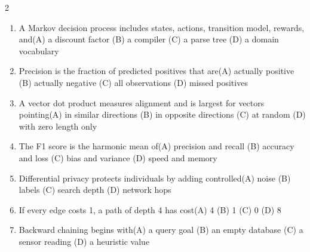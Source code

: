 \documentclass[a4paper]{article}
\begin{document}
\begin{multicols*}{2}
\begin{enumerate}
\item A Markov decision process includes states, actions, transition model, rewards, and\newline\hspace*{0.6em}(A) a discount factor \quad (B) a compiler \newline\hspace*{0.6em}(C) a parse tree \quad (D) a domain vocabulary
\item Precision is the fraction of predicted positives that are\newline\hspace*{0.6em}(A) actually positive \quad (B) actually negative \newline\hspace*{0.6em}(C) all observations \quad (D) missed positives
\item A vector dot product measures alignment and is largest for vectors pointing\newline\hspace*{0.6em}(A) in similar directions \quad (B) in opposite directions \newline\hspace*{0.6em}(C) at random \quad (D) with zero length only
\item The F1 score is the harmonic mean of\newline\hspace*{0.6em}(A) precision and recall \quad (B) accuracy and loss \newline\hspace*{0.6em}(C) bias and variance \quad (D) speed and memory
\item Differential privacy protects individuals by adding controlled\newline\hspace*{0.6em}(A) noise \quad (B) labels \newline\hspace*{0.6em}(C) search depth \quad (D) network hops
\item If every edge costs 1, a path of depth 4 has cost\newline\hspace*{0.6em}(A) 4 \quad (B) 1 \newline\hspace*{0.6em}(C) 0 \quad (D) 8
\item Backward chaining begins with\newline\hspace*{0.6em}(A) a query goal \quad (B) an empty database \newline\hspace*{0.6em}(C) a sensor reading \quad (D) a heuristic value

\end{enumerate}
\end{multicols*}
\end{document}
